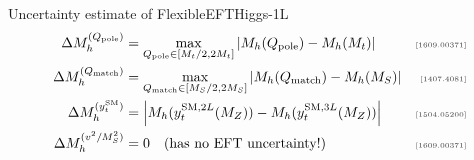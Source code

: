 \documentclass[hyperref={pdfpagelabels=false},ngerman]{beamer}
\newcommand{\MS}{\ensuremath{M_S}}
\newcommand{\mycite}[1]{\ensuremath{\text{\textcolor{darkgray}{\tiny [#1]}}}}
\newcommand{\SM}{\ensuremath{\text{SM}}}
\newcommand{\Qpole}{\ensuremath{Q_\text{pole}}}
\newcommand{\Qmatch}{\ensuremath{Q_\text{match}}}
\newcommand{\DMhQpole}{\ensuremath{\Delta M_h^{(\Qpole)}}}
\newcommand{\DMhQmatch}{\ensuremath{\Delta M_h^{(\Qmatch)}}}
\newcommand{\DMhHSSUSYytSM}{\ensuremath{\Delta M_h^{(y_t^\SM)}}}
\newcommand{\DMhEFT}{\ensuremath{\Delta M_h^{(v^2/\MS^2)}}}
\begin{document}
\begin{frame}[noframenumbering]{Uncertainty estimate of FlexibleEFTHiggs-1L}
  \begin{align*}
    \DMhQpole &= \max_{\Qpole\in[M_t/2,2M_t]}\left|M_h(\Qpole) - M_h(M_t)\right| & \text{\mycite{1609.00371}} \\
    \DMhQmatch &= \max_{\Qmatch\in[\MS/2,2\MS]}\left|M_h(\Qmatch) - M_h(\MS)\right| & \text{\mycite{1407.4081}} \\
    \DMhHSSUSYytSM &= \left| M_h(y_t^{\SM,2L}(M_Z)) - M_h(y_t^{\SM,3L}(M_Z)) \right| & \text{\mycite{1504.05200}} \\
    \DMhEFT &= 0 \quad \text{(has no EFT uncertainty!)} & \text{\mycite{1609.00371}}
  \end{align*}
\end{frame}
\end{document}
